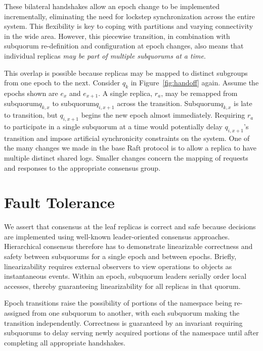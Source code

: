 \documentclass[10pt,conference]{IEEEtran}
\newcommand{\sub}{subquorum\xspace}
\newcommand{\Sub}{Subquorum\xspace}
\newcommand{\subs}{subquorums\xspace}
\begin{document}
These bilateral handshakes allow an epoch change to be implemented
incrementally, eliminating the need for lockstep synchronization across the entire
system.
This flexibility is key to coping with partitions and varying connectivity in
the wide area.
However, this piecewise transition, in combination with \sub re-definition and
configuration at epoch changes, also means that individual replicas \emph{may
be part of multiple \subs at a time}.

This overlap is possible because replicas may be mapped to distinct subgroups
from one epoch to the next.
Consider $q_k$ in Figure~\ref{fig:handoff} again.
Assume the epochs shown are $e_x$ and $e_{x+1}$.
A single replica, $r_a$, may be remapped from \sub $q_{k,x}$ to \sub $q_{i,x+1}$ across the
transition.
\Sub $q_{k,x}$ is late to transition, but $q_{i,x+1}$ begins the new epoch
almost immediately.
Requiring $r_a$ to participate in a single \sub at a time would potentially delay
$q_{i,x+1}$'s transition and impose artificial synchronicity constraints on the
system.
One of the many changes we made in the base Raft protocol is to
allow a replica to have multiple distinct shared
logs.
Smaller changes concern the mapping of requests and responses to the appropriate
consensus group.

\section{Fault Tolerance}
\label{section:ft}

We assert that consensus at the leaf replicas is correct and safe because decisions are
implemented using well-known leader-oriented consensus approaches.
Hierarchical consensus therefore has to demonstrate linearizable correctness and safety
between \subs for a single epoch and between epochs.
Briefly, linearizability requires external observers to view operations to objects as
instantaneous events.
Within an epoch, subquorum leaders serially order local accesses, thereby guaranteeing
linearizability for all replicas in that quorum.

Epoch transitions raise the possibility of portions of the namespace being re-assigned from one \sub to
another, with each \sub making the transition independently.
Correctness is guaranteed by an invariant requiring \subs to delay serving newly
acquired portions of the namespace until after completing all appropriate handshakes.
\end{document}
